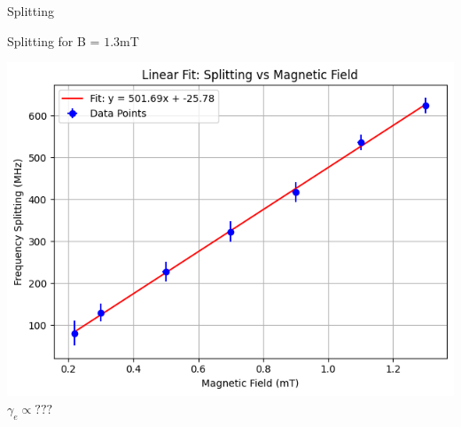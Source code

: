 \documentclass{beamer}
\begin{document}
\begin{frame}{Splitting}
\begin{minipage}{0.48\textwidth}
        {\small Splitting for B = $1.3$mT}
    \end{minipage}
    \hfill
    \begin{minipage}{0.48\textwidth}
        \centering
        \includegraphics[width=\linewidth]{presentation/figs/split_vs_field.png}
        {\small $\gamma_e \propto ???$}
    \end{minipage}
\end{frame}
\end{document}
